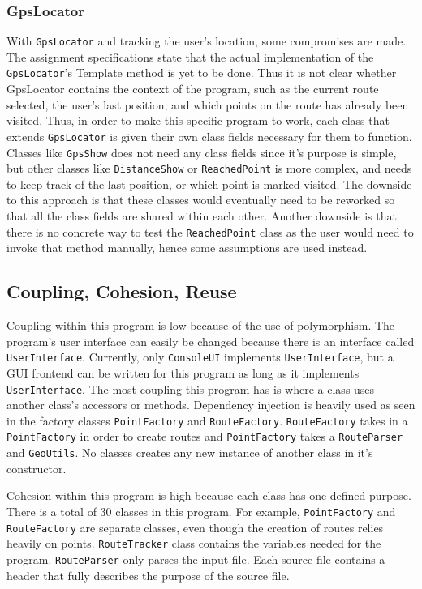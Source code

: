 \documentclass[a4paper, 12pt, titlepage]{article}
\newcommand{\code}[1]{\small\texttt{#1}\normalsize}
\begin{document}
\subsubsection{GpsLocator}

With \code{GpsLocator} and tracking the user's location, some compromises are
made. The assignment specifications state that the actual implementation of the
\code{GpsLocator}'s Template method is yet to be done. Thus it is not clear
whether GpsLocator contains the context of the program, such as the current
route selected, the user's last position, and which points on the route has
already been visited. Thus, in order to make this specific program to work,
each class that extends \code{GpsLocator} is given their own class fields
necessary for them to function. Classes like \code{GpsShow} does not need any
class fields since it's purpose is simple, but other classes like
\code{DistanceShow} or \code{ReachedPoint} is more complex, and needs to keep
track of the last position, or which point is marked visited. The downside to
this approach is that these classes would eventually need to be reworked so
that all the class fields are shared within each other. Another downside is
that there is no concrete way to test the \code{ReachedPoint} class as the user
would need to invoke that method manually, hence some assumptions are used
instead.


\subsection{Coupling, Cohesion, Reuse}

Coupling within this program is low because of the use of polymorphism. The
program's user interface can easily be changed because there is an interface
called \code{UserInterface}. Currently, only \code{ConsoleUI} implements
\code{UserInterface}, but a GUI frontend can be written for this program as
long as it implements \code{UserInterface}. The most coupling this program has
is where a class uses another class's accessors or methods. Dependency
injection is heavily used as seen in the factory classes \code{PointFactory}
and \code{RouteFactory}. \code{RouteFactory} takes in a \code{PointFactory} in
order to create routes and \code{PointFactory} takes a \code{RouteParser} and
\code{GeoUtils}. No classes creates any new instance of another class in it's
constructor.

Cohesion within this program is high because each class has one defined
purpose. There is a total of 30 classes in this program. For example,
\code{PointFactory} and \code{RouteFactory} are separate classes, even though
the creation of routes relies heavily on points. \code{RouteTracker} class
contains the variables needed for the program. \code{RouteParser} only parses
the input file. Each source file contains a header that fully describes the
purpose of the source file.
\end{document}
